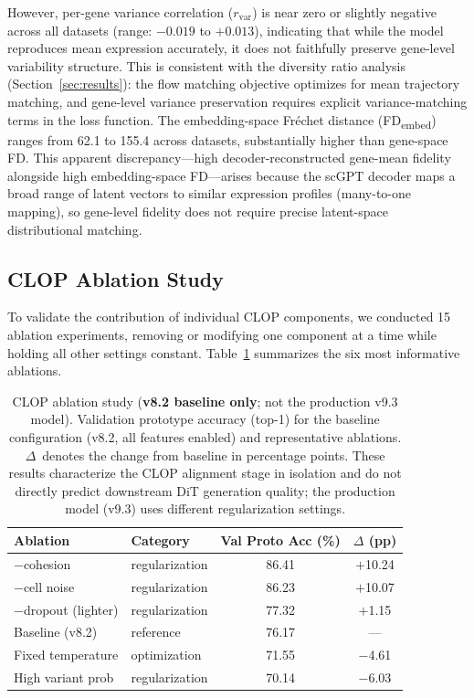 \documentclass[biology,article,submit,pdftex,moreauthors]{Definitions/mdpi}
\begin{document}
However, per-gene variance correlation ($r_\text{var}$) is near zero or slightly negative across all datasets (range: $-0.019$ to $+0.013$), indicating that while the model reproduces mean expression accurately, it does not faithfully preserve gene-level variability structure. This is consistent with the diversity ratio analysis (Section~\ref{sec:results}): the flow matching objective optimizes for mean trajectory matching, and gene-level variance preservation requires explicit variance-matching terms in the loss function. The embedding-space Fr\'{e}chet distance (FD\textsubscript{embed}) ranges from 62.1 to 155.4 across datasets, substantially higher than gene-space FD. This apparent discrepancy---high decoder-reconstructed gene-mean fidelity alongside high embedding-space FD---arises because the scGPT decoder maps a broad range of latent vectors to similar expression profiles (many-to-one mapping), so gene-level fidelity does not require precise latent-space distributional matching.

\subsection{CLOP Ablation Study}\label{sec:ablation}

To validate the contribution of individual CLOP components, we conducted 15 ablation experiments, removing or modifying one component at a time while holding all other settings constant. Table~\ref{tab:ablation} summarizes the six most informative ablations.

\begin{table}[!htbp]
\caption{CLOP ablation study (\textbf{v8.2 baseline only}; not the production v9.3 model). Validation prototype accuracy (top-1) for the baseline configuration (v8.2, all features enabled) and representative ablations. $\Delta$~denotes the change from baseline in percentage points. These results characterize the CLOP alignment stage in isolation and do not directly predict downstream DiT generation quality; the production model (v9.3) uses different regularization settings.\label{tab:ablation}}
\centering
\small
\begin{tabular}{llcc}
\toprule
\textbf{Ablation} & \textbf{Category} & \textbf{Val Proto Acc (\%)} & \textbf{$\Delta$ (pp)} \\
\midrule
$-$cohesion        & regularization & 86.41 & $+$10.24 \\
$-$cell noise      & regularization & 86.23 & $+$10.07 \\
$-$dropout (lighter) & regularization & 77.32 & $+$1.15 \\
Baseline (v8.2)    & reference      & 76.17 & --- \\
Fixed temperature   & optimization   & 71.55 & $-$4.61 \\
High variant prob   & regularization & 70.14 & $-$6.03 \\
\bottomrule
\end{tabular}
\end{table}
\end{document}
